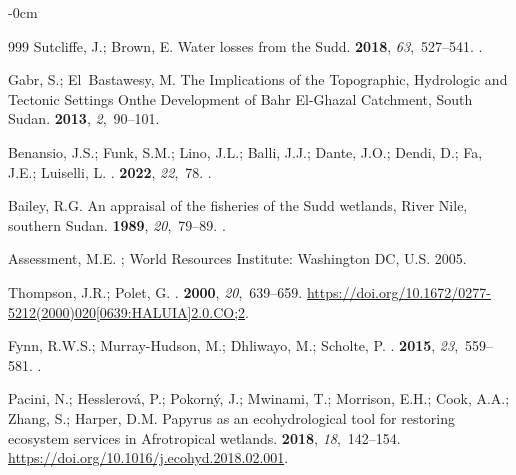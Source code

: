 \documentclass[analytics,article,accept,pdftex,moreauthors]{Definitions/mdpi}
\begin{document}
\begin{adjustwidth}{-\extralength}{0cm}
\begin{thebibliography}{999}
Sutcliffe, J.; Brown, E.
\newblock Water losses from the Sudd.
 {\bf 2018}, {\em 63},~527--541.
.

Gabr, S.; El~Bastawesy, M.
\newblock The Implications of the Topographic, Hydrologic and Tectonic Settings
  Onthe Development of Bahr El-Ghazal Catchment, South Sudan.
  {\bf 2013}, {\em 2},~90--101.

Benansio, J.S.; Funk, S.M.; Lino, J.L.; Balli, J.J.; Dante, J.O.; Dendi, D.;
  Fa, J.E.; Luiselli, L.
.
 {\bf 2022}, {\em 22},~78.
.

\newpage  
{}
Bailey, R.G.
\newblock An appraisal of the fisheries of the Sudd wetlands, River Nile,
  southern Sudan.
 {\bf 1989}, {\em 20},~79--89.
.

Assessment, M.E.
; World
  Resources Institute: Washington DC, U.S. %
  2005.

Thompson, J.R.; Polet, G.
.
 {\bf 2000}, {\em 20},~639--659.
\newblock
  {\url{https://doi.org/10.1672/0277-5212(2000)020[0639:HALUIA]2.0.CO;2}}.

Fynn, R.W.S.; Murray-Hudson, M.; Dhliwayo, M.; Scholte, P.
.
 {\bf 2015}, {\em 23},~559--581.
.

Pacini, N.; Hesslerová, P.; Pokorný, J.; Mwinami, T.; Morrison, E.H.; Cook,
  A.A.; Zhang, S.; Harper, D.M.
\newblock Papyrus as an ecohydrological tool for restoring ecosystem services
  in Afrotropical wetlands.
 {\bf 2018}, {\em 18},~142--154.
\newblock %
  {\url{https://doi.org/10.1016/j.ecohyd.2018.02.001}}.


\end{thebibliography}
\end{adjustwidth}
\end{document}
